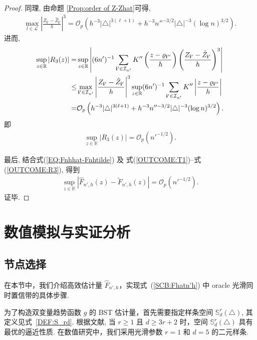 \documentclass[a4paper,openay,14pt]{ctexbook}
\numberwithin{equation}{section}
\numberwithin{lem}{section}
\newcommand{\chapterwithfancyheader}[1]{  
    \chapter{#1} %
    \thispagestyle{fancy} %
}
\begin{document}
\begin{proof}
同理, 由命题 \ref{Prop:order of Z-Zhat}可得,
\begin{align*}
            \max_{l\in\mathcal{L}}\left\vert\frac{Z_{\mathbf{i}'}-\hat{Z}_{\mathbf{i}'}}{h}\right\vert^3 = \mathcal{O}_p\left(h^{-3}\vert\triangle\vert^{3(\ell+1)}+h^{-3}n''^{-3/2}\vert\triangle\vert^{-3}(\log n)^{3/2}\right).
        \end{align*}
进而,
\begin{align*}
            \sup_{z\in\mathbb{R}}\left\vert R_3(z)\right\vert = & \sup_{z\in\mathbb{R}}\left\vert (6n')^{-1}\sum_{\mathbf{i}'\in\mathcal{I}_{n'}}K''\left(\frac{z-\varrho_{\mathbf{i}''}}{h}\right)\left(\frac{Z_{\mathbf{i}'}-\hat{Z}_{\mathbf{i}'}}{h}\right)^3\right\vert\notag\\
            \leq& \max_{\mathbf{i}'\in\mathcal{I}_{n'}}\left\vert\frac{Z_{\mathbf{i}'}-\hat{Z}_{\mathbf{i}'}}{h}\right\vert^3\sup_{z\in\mathbb{R}}(6n')^{-1}\sum_{\mathbf{i}'\in\mathcal{I}_{n'}}K''\left\vert\frac{z-\varrho_{\mathbf{i}''}}{h}\right\vert\notag\\
            =& \mathcal{O}_p\left(h^{-3}\vert\triangle\vert^{3(\ell+1)}+h^{-3}n''^{-3/2}\vert\triangle\vert^{-3}(\log n)^{3/2}\right).\notag
        \end{align*}
        即
    \begin{align}\label{OUTCOME:R3}
                \sup_{z\in\mathbb{R}}\left\vert R_3(z)\right\vert = {\scriptstyle\mathcal{O}}_p(n'^{-1/2}).
            \end{align}

最后, 结合式(\ref{EQ:Fnhhat-Fnhtilde}) 及
式(\ref{OUTCOME:T1})–式(\ref{OUTCOME:R3}), 得到
\begin{align*}
    \sup_{z\in\mathbb{R}}
    \left|\hat{F}_{n',h}(z)-\tilde{F}_{n',h}(z)\right|
    ={\scriptstyle\mathcal{O}}_p\left(n'^{-1/2}\right).
\end{align*}
证毕.

\end{proof}


\chapterwithfancyheader{数值模拟与实证分析}\label{SEC: application}

\section{节点选择}
在本节中，我们介绍高效估计量 $\hat{F}_{n',h}$，实现式~(\ref{SCB:Fhatn'h}) 中 oracle 光滑同时置信带的具体步骤.

为了构造双变量趋势函数 $g$ 的 BST 估计量，首先需要指定样条空间 $\mathbb{S}_{d}^{r}(\triangle)$, 其定义见式~\eqref{DEF:S_rd}. 根据文献\cite{lai2007spline}, 当 $r \geq 1$ 且 $d \geq 3r + 2$ 时，空间 $\mathbb{S}_{d}^{r}(\triangle)$ 具有最优的逼近性质. 在数值研究中，我们采用光滑参数 $r = 1$ 和 $d = 5$ 的二元样条.
\end{document}
